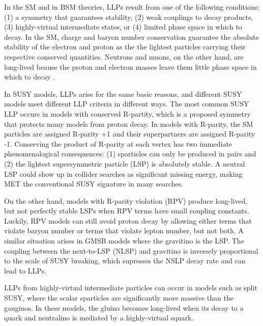\documentclass[12pt]{article}
\begin{document}
    In the SM and in BSM theories, LLPs result from one of the following conditions: (1) a symmetry that guarantees stability, (2) weak couplings to decay products, (3) highly-virtual intermediate states, or (4) limited phase space in which to decay. In the SM, charge and baryon number conservation guarantee the absolute stability of the electron and proton as the the lightest particles carrying their respective conserved quantities. Neutrons and muons, on the other hand, are long-lived beause the proton and electron masses leave them little phase space in which to decay . 

    In SUSY models, LLPs arise for the same basic reasons, and different SUSY models meet different LLP criteria in different ways. The most common SUSY LLP occurs in models with conserved R-partity, which is a proposed symmetry that protects many models from proton decay. In models with R-parity, the SM particles are assigned R-parity +1 and their superpartners are assigned R-parity -1. Conserving the product of R-parity at each vertex has two immediate phenomenalogical consequences: (1) sparticles can only be produced in pairs and (2) the lightest supersymmetric particle (LSP) is absolutely stable. A neutral LSP could show up in collider searches as significant missing energy, making MET the conventional SUSY signature in many searches.

    On the other hand, models with R-parity violation (RPV) produce long-lived, but not perfectly stable LSPs when RPV terms have small coupling constants. Luckily, RPV models can still avoid proton decay by allowing either terms that violate baryon number or terms that violate lepton number, but not both. A similar situation arises in GMSB models where the gravitino is the LSP. The coupling between the next-to-LSP (NLSP) and gravitino is inversely proportional to the scale of SUSY breaking, which supresses the NSLP decay rate and can lead to LLPs. 

    LLPs from highly-virtual intermediate particles can occur in models such as split SUSY, where the scalar sparticles are significantly more massive than the gauginos. In these models, the gluino becomes long-lived when its decay to a quark and neutralino is mediated by a highly-virtual squark.  
\end{document}
